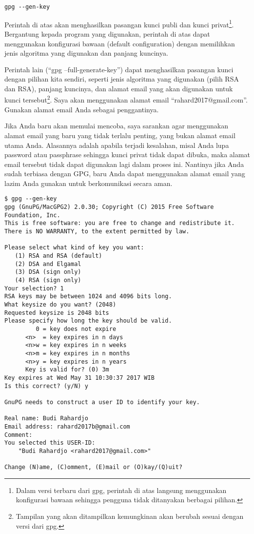 \begin{verbatim}
gpg --gen-key
\end{verbatim}

Perintah di atas akan menghasilkan pasangan kunci publi dan kunci privat\footnote{Dalam
versi terbaru dari gpg, perintah di atas langsung menggunakan konfigurasi bawaan
sehingga pengguna tidak ditanyakan berbagai pilihan.}.
Bergantung kepada program yang digunakan, perintah di atas dapat menggunakan
konfigurasi bawaan (default configuration) dengan memilihkan jenis algoritma
yang digunakan dan panjang kuncinya.

Perintah lain (``gpg --full-generate-key'') dapat menghasilkan pasangan kunci 
dengan pilihan kita sendiri, seperti jenis algoritma yang digunakan 
(pilih RSA dan RSA), panjang kuncinya,
dan alamat email yang akan digunakan untuk kunci tersebut\footnote{Tampilan yang akan 
ditampilkan kemungkinan akan berubah sesuai dengan versi dari gpg.}.
Saya akan
menggunakan alamat email ``{rahard2017@gmail.com}''. Gunakan alamat email Anda
sebagai penggantinya.

Jika Anda baru akan memulai mencoba, saya sarankan agar menggunakan alamat
email yang baru yang tidak terlalu penting, yang bukan alamat email utama Anda.
Alasannya adalah apabila terjadi kesalahan, misal Anda lupa password atau
passphrase sehingga kunci privat tidak dapat dibuka, maka alamat email
tersebut tidak dapat digunakan lagi dalam proses ini.
Nantinya jika Anda sudah terbiasa dengan GPG, baru Anda dapat menggunakan
alamat email yang lazim Anda gunakan untuk berkomunikasi secara aman.

\begin{verbatim}
$ gpg --gen-key
gpg (GnuPG/MacGPG2) 2.0.30; Copyright (C) 2015 Free Software Foundation, Inc.
This is free software: you are free to change and redistribute it.
There is NO WARRANTY, to the extent permitted by law.

Please select what kind of key you want:
   (1) RSA and RSA (default)
   (2) DSA and Elgamal
   (3) DSA (sign only)
   (4) RSA (sign only)
Your selection? 1
RSA keys may be between 1024 and 4096 bits long.
What keysize do you want? (2048)
Requested keysize is 2048 bits
Please specify how long the key should be valid.
         0 = key does not expire
      <n>  = key expires in n days
      <n>w = key expires in n weeks
      <n>m = key expires in n months
      <n>y = key expires in n years
      Key is valid for? (0) 3m
Key expires at Wed May 31 10:30:37 2017 WIB
Is this correct? (y/N) y

GnuPG needs to construct a user ID to identify your key.

Real name: Budi Rahardjo
Email address: rahard2017b@gmail.com
Comment:
You selected this USER-ID:
    "Budi Rahardjo <rahard2017@gmail.com>"

Change (N)ame, (C)omment, (E)mail or (O)kay/(Q)uit?
\end{verbatim}

